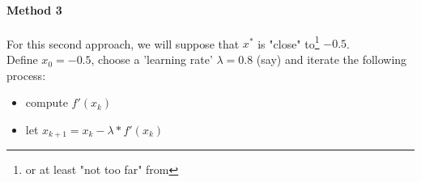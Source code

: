 \documentclass[]{article}
\begin{document}
	\paragraph{Method 3}
	For this second approach, we will suppose that $x^*$ is "close" to\footnote{or at least "not too far" from} $-0.5$.\\
	Define $x_0=-0.5$, choose a 'learning rate' $\lambda=0.8$ (say) and iterate the following process:
	\begin{itemize}
		\item compute $f'(x_k)$
		\item let $x_{k+1} = x_k - \lambda * f'(x_k)$
	\end{itemize}
	
	
	
	
	
	
	
\end{document}
